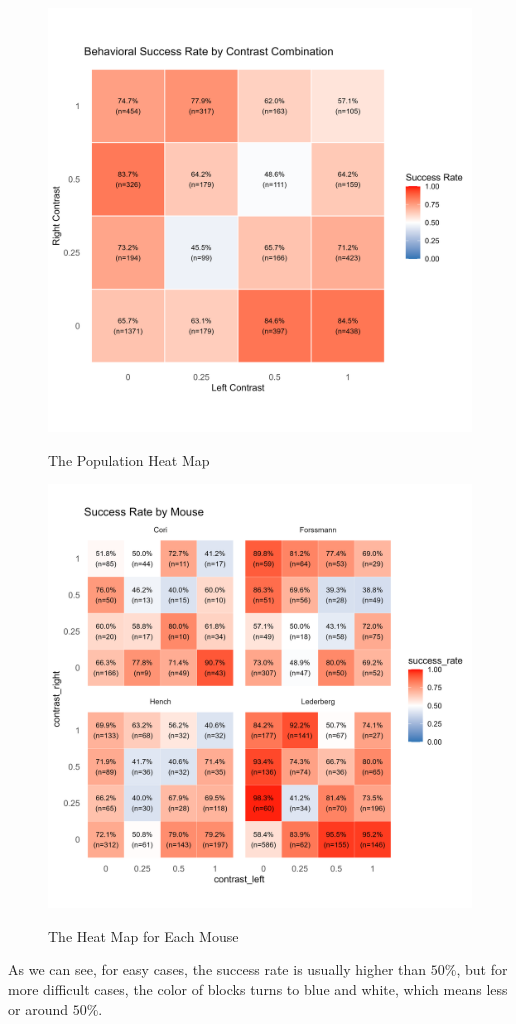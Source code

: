 \documentclass{article}
\begin{document}
	\begin{figure}[htbp]
		\centering
		\begin{minipage}[t]{0.48\textwidth}
			\centering
			\includegraphics[scale=0.4]{Pics/002}\label{fig:1.3}
			\caption{The Population Heat Map}
		\end{minipage}
		\begin{minipage}[t]{0.48\textwidth}
			\centering
			\includegraphics[scale=0.4]{Pics/003}\label{fig:1.4}
			\caption{The Heat Map for Each Mouse}
		\end{minipage}
	\end{figure}
	\par As we can see, for easy cases, the success rate is usually higher than $50\%$, but for more difficult cases, the color of blocks turns to blue and white, which means less or around $50\%.$
\clearpage
\end{document}
